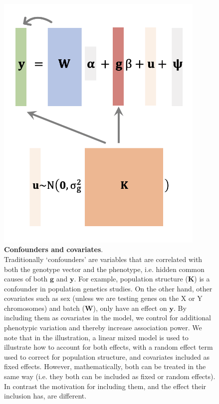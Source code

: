 \begin{figure}[htbp]
\centering
\includegraphics[width=10cm]{Chapter2/Fig/confounders_covariates.png}
\caption[Confounders and covariates]{\textbf{Confounders and covariates}.\\
Traditionally `confounders' are variables that are correlated with both the genotype vector and the phenotype, i.e. hidden common causes of both $\mathbf{g}$ and  $\mathbf{y}$. 
For example, population structure ($\mathbf{K}$) is a confounder in population genetics studies. 
On the other hand, other covariates such as sex (unless we are testing genes on the X or Y chromosomes) and batch ($\mathbf{W}$), only have an effect on $\mathbf{y}$.
By including them as covariates in the model, we control for additional phenotypic variation and thereby increase association power. 
We note that in the illustration, a linear mixed model is used to illustrate how to account for both effects, with a random effect term used to correct for population structure, and covariates included as fixed effects. 
However, mathematically, both can be treated in the same way (i.e. they both can be included as fixed or random effects). 
In contrast the motivation for including them, and the effect their inclusion has, are different.}
\label{fig:conf_cov}
\end{figure}



